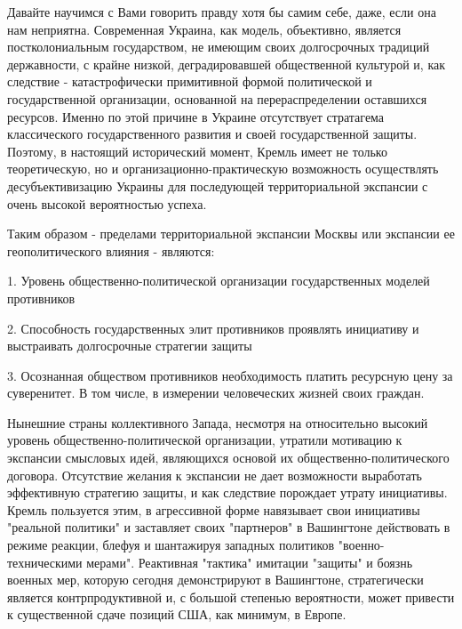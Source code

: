 Давайте научимся с Вами говорить правду хотя бы самим себе, даже, если она нам неприятна. Современная Украина, как модель, объективно, является постколониальным государством, не имеющим своих долгосрочных традиций державности, с крайне низкой, деградировавшей общественной культурой и, как следствие - катастрофически примитивной формой политической и государственной организации, основанной на перераспределении оставшихся ресурсов. Именно по этой причине в Украине отсутствует стратагема классического государственного развития и своей государственной защиты. Поэтому, в настоящий исторический момент, Кремль имеет не только теоретическую, но и организационно-практическую возможность осуществлять десубъективизацию Украины для последующей территориальной экспансии с очень высокой вероятностью успеха.

Таким образом - пределами территориальной экспансии Москвы или экспансии ее геополитического влияния - являются:

1. Уровень общественно-политической организации государственных моделей противников

2. Способность государственных элит противников проявлять инициативу и выстраивать долгосрочные стратегии защиты

3. Осознанная обществом противников необходимость платить ресурсную цену за суверенитет. В том числе, в измерении человеческих жизней своих граждан.

Нынешние страны коллективного Запада, несмотря на относительно высокий уровень общественно-политической организации, утратили мотивацию к экспансии смысловых идей, являющихся основой их общественно-политического договора. Отсутствие желания к экспансии не дает возможности выработать эффективную стратегию защиты, и как следствие порождает утрату инициативы. Кремль пользуется этим, в агрессивной форме навязывает свои инициативы "реальной политики" и заставляет своих "партнеров" в Вашингтоне действовать в режиме реакции, блефуя и шантажируя западных политиков "военно-техническими мерами". Реактивная "тактика" имитации "защиты" и боязнь военных мер, которую сегодня демонстрируют в Вашингтоне, стратегически является контрпродуктивной и, с большой степенью вероятности, может привести к существенной сдаче позиций США, как минимум, в Европе.

